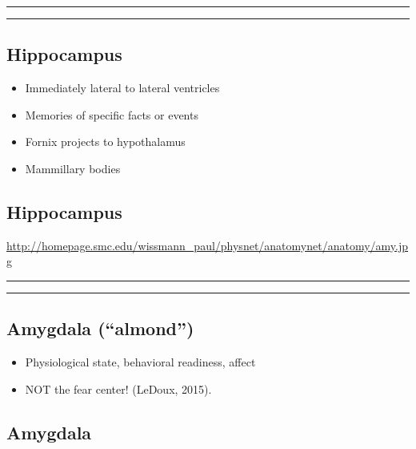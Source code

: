 \documentclass[]{article}
\providecommand{\tightlist}{%
  \setlength{\itemsep}{0pt}\setlength{\parskip}{0pt}}
\begin{document}
\begin{center}\rule{0.5\linewidth}{\linethickness}\end{center}

\begin{center}\rule{0.5\linewidth}{\linethickness}\end{center}

\subsection{Hippocampus}\label{hippocampus}

\begin{itemize}
\tightlist
\item
  Immediately lateral to lateral ventricles
\item
  Memories of specific facts or events
\item
  Fornix projects to hypothalamus
\item
  Mammillary bodies
\end{itemize}

\subsection{Hippocampus}\label{hippocampus-1}

\url{http://homepage.smc.edu/wissmann_paul/physnet/anatomynet/anatomy/amy.jpg}

\begin{center}\rule{0.5\linewidth}{\linethickness}\end{center}

\begin{center}\rule{0.5\linewidth}{\linethickness}\end{center}

\subsection{\texorpdfstring{Amygdala
(``almond'')}{Amygdala (almond)}}\label{amygdala-almond}

\begin{itemize}
\tightlist
\item
  Physiological state, behavioral readiness, affect
\item
  NOT the fear center! (LeDoux, 2015).
\end{itemize}

\subsection{Amygdala}\label{amygdala}
\end{document}
